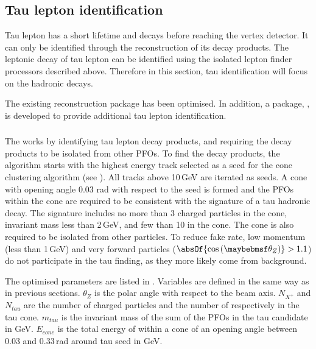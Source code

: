 \subsection{Tau lepton identification}

Tau lepton has a short lifetime and decays before reaching the vertex detector. It can only be identified through the reconstruction of its decay products. The leptonic decay of tau lepton can be identified using the isolated lepton finder processors described above. Therefore in this section, tau identification will focus on the hadronic decays.

The existing \TauFinderProcessor  \cite{LCD-Note-2010-009} reconstruction package has been optimised. In addition, a package, \BonoTauFinder, is developed to provide additional tau lepton identification.




\subsubsection{\TauFinderProcessor}

The \TauFinderProcessor works by identifying tau lepton decay products, and requiring the decay products to be isolated from other PFOs. To find the decay products, the algorithm starts with the highest energy track selected as a seed for the cone clustering algorithm  (see  ). All tracks above 10\,GeV are iterated as seeds. A cone with opening angle 0.03 rad with respect to the seed is formed and the PFOs within the cone are required to be consistent with the signature of a tau hadronic decay. The signature includes no more than 3 charged particles in the cone, invariant mass less than 2\,GeV, and few than 10 \PFOs in the cone. The cone is also required to be isolated from other particles. To reduce fake rate, low momentum (less than 1\,GeV) and very forward particles ($\absOf{\cos\left(\theta_Z\right)} > 1.1$) do not participate in the tau finding, as they more likely come from \ggHad background.


The optimised parameters are listed in . Variables are defined in the same way as in previous sections. $\theta_Z$ is the polar angle with respect to the beam axis. $N_{X^+}$ and $N_{tau}$ are the number of charged particles and the number of \PFOs respectively in the tau cone. $m_{tau}$ is the invariant mass of the sum of the PFOs in the tau candidate in GeV. $E_{cone}$ is the total energy of \PFOs within a cone of an opening angle between 0.03 and 0.33\,rad  around tau seed in GeV.

